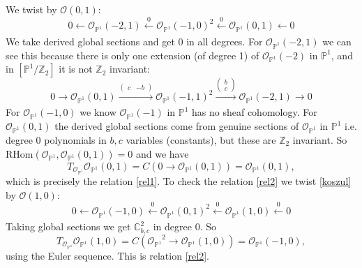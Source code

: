 \documentclass[oneside,reqno]{amsart}
\theoremstyle{definition}
\theoremstyle{definition}
\theoremstyle{definition}
\theoremstyle{definition}
\newcommand{\CC}{\mathbb{C}}
\newcommand{\PP}{\mathbb{P}}
\newcommand{\Z}{\mathbb{Z}}
\newcommand{\Os}{\mathcal{O}}
\begin{document}
We twist by $\Os(0,1)$:
$$
0 \xleftarrow[]{} \Os_{\PP^1}(-2,1) \xleftarrow[]{0} \Os_{\PP^1}(-1,0)^2\xleftarrow[]{0} \Os_{\PP^1}(0,1) \xleftarrow[]{}0
$$
We take derived global sections and get 0 in all degrees. For $\Os_{\PP^1}(-2,1)$ we can see this because there is only one extension (of degree 1) of $\Os_{\PP^1}(-2)$ in $\PP^1$, and in $[ \PP^1 / \Z_2 ]$ it is not $\Z_2$ invariant:
$$
0 \xrightarrow[]{} \Os_{\PP^1}(0,1) \xrightarrow[]{\begin{pmatrix}
    c & -b
\end{pmatrix}} \Os_{\PP^1}(-1,1)^2\xrightarrow[]{\begin{pmatrix}
    b \\
    c
\end{pmatrix}} \Os_{\PP^1}(-2,1) \xrightarrow[]{}0
$$
For $\Os_{\PP^1}(-1,0)$ we know $\Os_{\PP^1}(-1)$ in $\PP^1$ has no sheaf cohomology. For $\Os_{\PP^1}(0,1)$ the derived global sections come from genuine sections of $\Os_{\PP^1}$ in $\PP^1$ i.e. degree 0 polynomials in $b,c$ variables (constants), but these are $\Z_2$ invariant.
So $\text{RHom}\left(\Os_{\PP^1},\Os_{\PP^1}(0,1)\right) = 0$ and we have
$$
T_{\Os_{\PP^1}}\Os_{\PP^1}(0,1) = C(0 \to \Os_{\PP^1}(0,1)) =\Os_{\PP^1}(0,1),
$$
which is precisely the relation \eqref{rel1}. To check the relation \eqref{rel2} we twist \eqref{koszul} by $\Os(1,0)$:
\begin{equation*}
0 \xleftarrow[]{} \Os_{\PP^1}(-1,0) \xleftarrow[]{0} \Os_{\PP^1}(0,1)^2\xleftarrow[]{0} \Os_{\PP^1}(1,0) \xleftarrow[]{0} 0
\end{equation*}
Taking global sections we get $\CC^2_{b,c}$ in degree 0. So
$$
T_{\Os_{\PP^1}}\Os_{\PP^1}(1,0) = C({\Os_{\PP^1}}^2 \to \Os_{\PP^1}(1,0)) =\Os_{\PP^1}(-1,0),
$$
using the Euler sequence. This is relation \eqref{rel2}.
\end{document}
